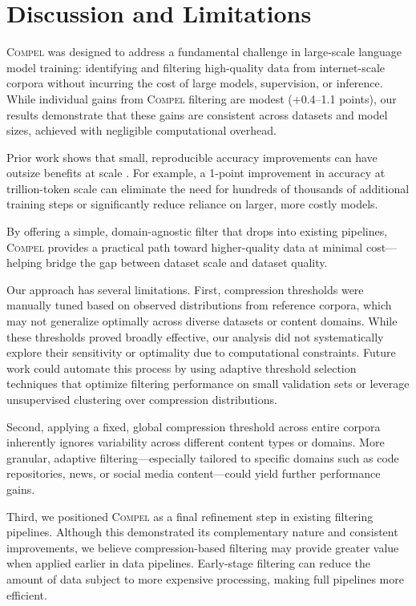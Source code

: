 \section{Discussion and Limitations}\label{sec:discussion}

\textsc{Compel} was designed to address a fundamental challenge in large-scale language model training: identifying and filtering high-quality data from internet-scale corpora without incurring the cost of large models, supervision, or inference.
While individual gains from \textsc{Compel} filtering are modest (+0.4--1.1 points), our results demonstrate that these gains are consistent across datasets and model sizes, achieved with negligible computational overhead.

Prior work shows that small, reproducible accuracy improvements can have outsize benefits at scale \citep{marion2023less, ankner2024perplexed, tirumala2023d4}.
For example, a 1-point improvement in accuracy at trillion-token scale can eliminate the need for hundreds of thousands of additional training steps or significantly reduce reliance on larger, more costly models.

By offering a simple, domain-agnostic filter that drops into existing pipelines, \textsc{Compel} provides a practical path toward higher-quality data at minimal cost---helping bridge the gap between dataset scale and dataset quality.

Our approach has several limitations.
First, compression thresholds were manually tuned based on observed distributions from reference corpora, which may not generalize optimally across diverse datasets or content domains.
While these thresholds proved broadly effective, our analysis did not systematically explore their sensitivity or optimality due to computational constraints.
Future work could automate this process by using adaptive threshold selection techniques that optimize filtering performance on small validation sets or leverage unsupervised clustering over compression distributions.

Second, applying a fixed, global compression threshold across entire corpora inherently ignores variability across different content types or domains.
More granular, adaptive filtering---especially tailored to specific domains such as code repositories, news, or social media content---could yield further performance gains.

Third, we positioned \textsc{Compel} as a final refinement step in existing filtering pipelines.
Although this demonstrated its complementary nature and consistent improvements, we believe compression-based filtering may provide greater value when applied earlier in data pipelines.
Early-stage filtering can reduce the amount of data subject to more expensive processing, making full pipelines more efficient.

